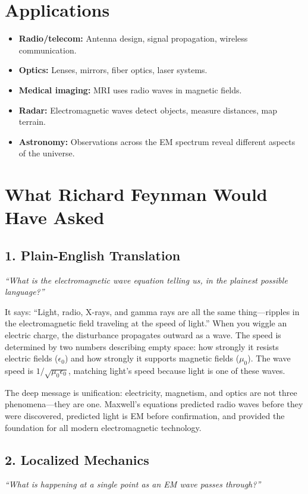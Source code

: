 \section*{Applications}

\begin{itemize}
\item \textbf{Radio/telecom:} Antenna design, signal propagation, wireless communication.
\item \textbf{Optics:} Lenses, mirrors, fiber optics, laser systems.
\item \textbf{Medical imaging:} MRI uses radio waves in magnetic fields.
\item \textbf{Radar:} Electromagnetic waves detect objects, measure distances, map terrain.
\item \textbf{Astronomy:} Observations across the EM spectrum reveal different aspects of the universe.
\end{itemize}
\section*{What Richard Feynman Would Have Asked}

\subsection*{1. Plain-English Translation}
\textit{``What is the electromagnetic wave equation telling us, in the plainest possible language?''}

It says: ``Light, radio, X-rays, and gamma rays are all the same thing---ripples in the electromagnetic field traveling at the speed of light.'' When you wiggle an electric charge, the disturbance propagates outward as a wave. The speed is determined by two numbers describing empty space: how strongly it resists electric fields ($\epsilon_0$) and how strongly it supports magnetic fields ($\mu_0$). The wave speed is $1/\sqrt{\mu_0 \epsilon_0}$, matching light's speed because light is one of these waves.

The deep message is unification: electricity, magnetism, and optics are not three phenomena---they are one. Maxwell's equations predicted radio waves before they were discovered, predicted light is EM before confirmation, and provided the foundation for all modern electromagnetic technology.

\subsection*{2. Localized Mechanics}
\textit{``What is happening at a single point as an EM wave passes through?''}

